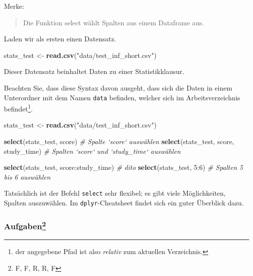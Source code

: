 \documentclass[12pt,ngerman,]{book}
\makeatletter
\newenvironment{Shaded}{\begin{snugshade}}{\end{snugshade}}
\newcommand{\KeywordTok}[1]{\textcolor[rgb]{0.13,0.29,0.53}{\textbf{{#1}}}}
\newcommand{\DecValTok}[1]{\textcolor[rgb]{0.00,0.00,0.81}{{#1}}}
\newcommand{\StringTok}[1]{\textcolor[rgb]{0.31,0.60,0.02}{{#1}}}
\newcommand{\CommentTok}[1]{\textcolor[rgb]{0.56,0.35,0.01}{\textit{{#1}}}}
\newcommand{\NormalTok}[1]{{#1}}
\let\rmarkdownfootnote\footnote%
\def\footnote{\protect\rmarkdownfootnote}
\newenvironment{kframe}{%
\medskip{}
\setlength{\fboxsep}{.8em}
 \def\at@end@of@kframe{}%
 \ifinner\ifhmode%
  \def\at@end@of@kframe{\end{minipage}}%
  \begin{minipage}{\columnwidth}%
 \fi\fi%
 \def\FrameCommand##1{\hskip\@totalleftmargin \hskip-\fboxsep
 \colorbox{shadecolor}{##1}\hskip-\fboxsep
     \hskip-\linewidth \hskip-\@totalleftmargin \hskip\columnwidth}%
 \MakeFramed {\advance\hsize-\width
   \@totalleftmargin\z@ \linewidth\hsize
   \@setminipage}}%
 {\par\unskip\endMakeFramed%
 \at@end@of@kframe}
\renewenvironment{Shaded}{\begin{kframe}}{\end{kframe}}
\theoremstyle{definition}
\theoremstyle{definition}
\theoremstyle{remark}
\makeatother
\begin{document}
Merke:

\begin{quote}
Die Funktion select wählt Spalten aus einem Dataframe aus.
\end{quote}

Laden wir als ersten einen Datensatz.

\begin{Shaded}
\begin{Highlighting}[]
\NormalTok{stats_test <-}\StringTok{ }\KeywordTok{read.csv}\NormalTok{(}\StringTok{"data/test_inf_short.csv"}\NormalTok{)}
\end{Highlighting}
\end{Shaded}

Dieser Datensatz beinhaltet Daten zu einer Statistikklausur.

Beachten Sie, dass diese Syntax davon ausgeht, dass sich die Daten in
einem Unterordner mit dem Namen \texttt{data} befinden, welcher sich im
Arbeitsverzeichnis befindet\footnote{der angegebene Pfad ist also
  \emph{relativ} zum aktuellen Verzeichnis.}.

\begin{Shaded}
\begin{Highlighting}[]

\NormalTok{stats_test <-}\StringTok{ }\KeywordTok{read.csv}\NormalTok{(}\StringTok{"data/test_inf_short.csv"}\NormalTok{)}
\end{Highlighting}
\end{Shaded}

\begin{Shaded}
\begin{Highlighting}[]
\KeywordTok{select}\NormalTok{(stats_test, score)  }\CommentTok{# Spalte `score` auswählen}
\KeywordTok{select}\NormalTok{(stats_test, score, study_time)  }
\CommentTok{# Spalten `score` und `study_time` auswählen}

\KeywordTok{select}\NormalTok{(stats_test, score:study_time) }\CommentTok{# dito}
\KeywordTok{select}\NormalTok{(stats_test, }\DecValTok{5}\NormalTok{:}\DecValTok{6}\NormalTok{)  }\CommentTok{# Spalten 5 bis 6 auswählen}
\end{Highlighting}
\end{Shaded}

Tatsächlich ist der Befehl \texttt{select} sehr flexibel; es gibt viele
Möglichkeiten, Spalten auszuwählen. Im \texttt{dplyr}-Cheatsheet findet
sich ein guter Überblick dazu.

\subsubsection[Aufgaben]{\texorpdfstring{Aufgaben\footnote{F, F, R, R, F}}{Aufgaben}}\label{aufgaben-3}
\end{document}
